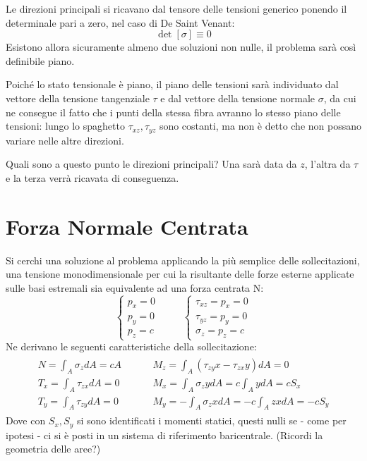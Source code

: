 \begin{itemize}
	Le direzioni principali si ricavano dal tensore delle tensioni generico ponendo il determinale pari a zero, nel caso di De Saint Venant: 
	\[ \det[\sigma] \equiv 0 \]
	Esistono allora sicuramente almeno due soluzioni non nulle, il problema sarà così definibile piano.
	
	Poiché lo stato tensionale è piano, il piano delle tensioni sarà individuato dal vettore della tensione tangenziale $\tau$ e dal vettore della tensione normale $\sigma$, da cui ne consegue il fatto che i punti della stessa fibra avranno lo stesso piano delle tensioni: lungo lo spaghetto $\tau_{xz}, \tau_{yz}$ sono costanti, ma non è detto che non possano variare nelle altre direzioni. \newline
	
	Quali sono a questo punto le direzioni principali? Una sarà data da $z$, l'altra da $\tau$ e la terza verrà ricavata di conseguenza. 
\end{itemize}
		
\section{Forza Normale Centrata}
	Si cerchi una soluzione al problema applicando la più semplice delle sollecitazioni, una tensione monodimensionale per cui la risultante delle forze esterne applicate sulle basi estremali sia equivalente ad una forza centrata N:
	\[ \begin{cases}
		p_x =0 \\
		p_y = 0 \\
		p_z = c
	\end{cases} \hspace{1cm} \begin{cases}
	\tau_{xz} = p_x = 0 \\
	\tau_{yz} = p_y = 0 \\
	\sigma_z = p_z = c
\end{cases}\]
	Ne derivano le seguenti caratteristiche della sollecitazione:
	\[\begin{matrix}
		\begin{aligned}
			N = \int_A \sigma_zdA = cA \hspace{1cm} & M_z = \int_A (\tau_{zy}x -\tau_{zx}y)dA = 0 \\
			T_x = \int_A \tau_{zx}dA = 0 \hspace{1cm} & M_x = \int_A \sigma_zydA = c\int_A ydA = cS_x  \\
			T_y = \int_A \tau_{zy}dA = 0 \hspace{1cm} & M_y = -\int_A \sigma_zxdA = -c\int_A zxdA = -cS_y
		\end{aligned}	
	\end{matrix}\]
 	Dove con $S_x, S_y$ si sono identificati i momenti statici, questi nulli se - come per ipotesi - ci si è posti in un sistema di riferimento baricentrale.  (Ricordi la geometria delle aree?) \newline
 	
